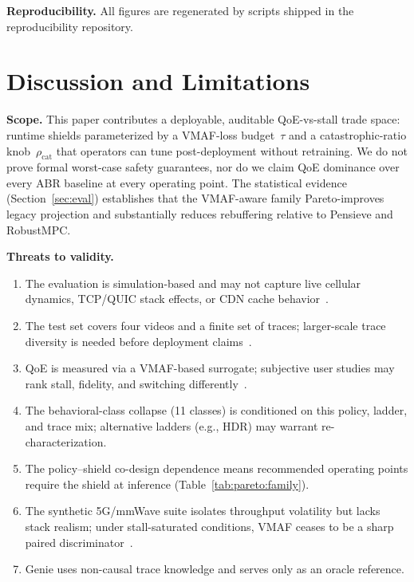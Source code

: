 \documentclass[preprint,12pt,times]{elsarticle}
\providecommand{\VShieldBehaviors}{11}
\begin{document}
\textbf{Reproducibility.} All figures are regenerated by scripts shipped in the reproducibility repository.

\section{Discussion and Limitations}
\label{sec:limits}

\textbf{Scope.}
This paper contributes a deployable, auditable QoE-vs-stall trade space: runtime shields parameterized by a VMAF-loss budget~$\tau$ and a catastrophic-ratio knob~$\rho_{\mathrm{cat}}$ that operators can tune post-deployment without retraining.
We do not prove formal worst-case safety guarantees, nor do we claim QoE dominance over every ABR baseline at every operating point.
The statistical evidence (Section~\ref{sec:eval}) establishes that the VMAF-aware family Pareto-improves legacy projection and substantially reduces rebuffering relative to Pensieve and RobustMPC.

\textbf{Threats to validity.}
\begin{enumerate}
  \item The evaluation is simulation-based and may not capture live cellular dynamics, TCP/QUIC stack effects, or CDN cache behavior~\cite{meng2024mmwave}.
  \item The test set covers four videos and a finite set of traces; larger-scale trace diversity is needed before deployment claims~\cite{kvalbein2014}.
  \item QoE is measured via a VMAF-based surrogate; subjective user studies may rank stall, fidelity, and switching differently~\cite{wu2024qoe}.
  \item The behavioral-class collapse (\VShieldBehaviors{} classes) is conditioned on this policy, ladder, and trace mix; alternative ladders (e.g., HDR) may warrant re-characterization.
  \item The policy--shield co-design dependence means recommended operating points require the shield at inference (Table~\ref{tab:pareto:family}).
  \item The synthetic 5G/mmWave suite isolates throughput volatility but lacks stack realism; under stall-saturated conditions, VMAF ceases to be a sharp paired discriminator~\cite{lakens2018equivalence}.
  \item Genie uses non-causal trace knowledge and serves only as an oracle reference.
\end{enumerate}
\end{document}
